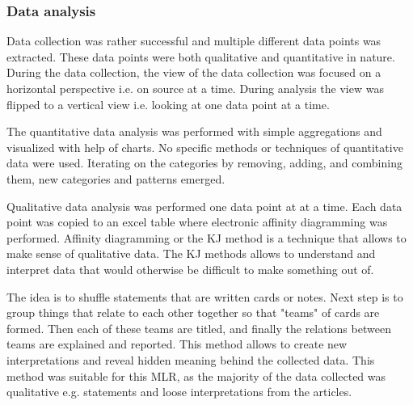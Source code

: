 \documentclass[english, 12pt, a4paper, sci, utf8, a-1b, online]{aaltothesis}
\begin{document}


\subsubsection{Data analysis}

Data collection was rather successful and multiple different data points was extracted. These data points were both qualitative and quantitative in nature. During the data collection, the view of the data collection was focused on a horizontal perspective i.e. on source at a time. During analysis the view was flipped to a vertical view i.e. looking at one data point at a time.

The quantitative data analysis was performed with simple aggregations and visualized with help of charts. No specific methods or techniques of quantitative data were used. Iterating on the categories by removing, adding, and combining them, new categories and patterns emerged.

Qualitative data analysis was performed one data point at at a time. Each data point was copied to an excel table where electronic affinity diagramming was performed. Affinity diagramming or the KJ method \parencite{scupin1997kj} is a technique that allows to make sense of qualitative data. The KJ methods allows to understand and interpret data that would otherwise be difficult to make something out of.

The idea is to shuffle statements that are written cards or notes. Next step is to group things that relate to each other together so that "teams" of cards are formed. Then each of these teams are titled, and finally the relations between teams are explained and reported. This method allows to create new interpretations and reveal hidden meaning behind the collected data. This method was suitable for this MLR, as the majority of the data collected was qualitative e.g. statements and loose interpretations from the articles.
\end{document}
